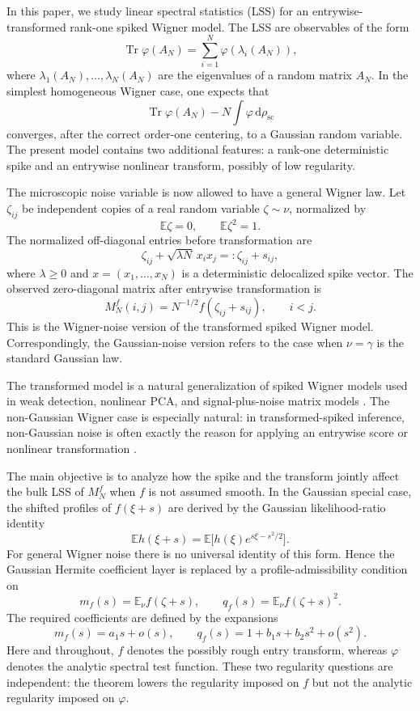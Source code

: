 \documentclass[11pt]{article}
\theoremstyle{definition}
\theoremstyle{remark}
\newcommand{\E}{\mathbb E}
\newcommand{\Tr}{\operatorname{Tr}}
\newcommand{\scal}{\mathrm{sc}}
\newcommand{\dd}{\mathrm d}
\begin{document}
In this paper, we study linear spectral statistics (LSS) for an entrywise-transformed rank-one spiked Wigner model.  The LSS are observables of the form
\[
        \Tr \varphi(A_N)=\sum_{i=1}^N \varphi(\lambda_i(A_N)),
\]
where \(\lambda_1(A_N),\ldots,\lambda_N(A_N)\) are the eigenvalues of a random matrix \(A_N\).  In the simplest homogeneous Wigner case, one expects that
\[
        \Tr\varphi(A_N)-N\int \varphi\,\dd\rho_{\scal}
\]
converges, after the correct order-one centering, to a Gaussian random variable.  The present model contains two additional features: a rank-one deterministic spike and an entrywise nonlinear transform, possibly of low regularity.

The microscopic noise variable is now allowed to have a general Wigner law.  Let \(\zeta_{ij}\) be independent copies of a real random variable \(\zeta\sim\nu\), normalized by
\[
        \E\zeta=0,\qquad \E\zeta^2=1.
\]
The normalized off-diagonal entries before transformation are
\[
        \zeta_{ij}+\sqrt{\lambda N}\,x_i x_j=:\zeta_{ij}+s_{ij},
\]
where \(\lambda\ge0\) and \(x=(x_1,\ldots,x_N)\) is a deterministic delocalized spike vector.  The observed zero-diagonal matrix after entrywise transformation is
\[
        M_N^f(i,j)=N^{-1/2}f(\zeta_{ij}+s_{ij}),\qquad i<j.
\]
This is the Wigner-noise version of the transformed spiked Wigner model. Correspondingly, the Gaussian-noise version refers to the case when \(\nu=\gamma\) is the standard Gaussian law.

The transformed model is a natural generalization of spiked Wigner models used in weak detection, nonlinear PCA, and signal-plus-noise matrix models \cite{Feldman2025,GuionnetKoKrzakalaMergnyZdeborova2023,MoniriHassani2024,LeeLee2025}.  The non-Gaussian Wigner case is especially natural: in transformed-spiked inference, non-Gaussian noise is often exactly the reason for applying an entrywise score or nonlinear transformation \cite{PerryWeinBandeiraMoitra2018,ChungLee2022}.

The main objective is to analyze how the spike and the transform jointly affect the bulk LSS of \(M_N^f\) when \(f\) is not assumed smooth.  In the Gaussian special case, the shifted profiles of \(f(\xi+s)\) are derived by the Gaussian likelihood-ratio identity
\[
        \E h(\xi+s)=\E\bigl[h(\xi)e^{s\xi-s^2/2}\bigr].
\]
For general Wigner noise there is no universal identity of this form.  Hence the Gaussian Hermite coefficient layer is replaced by a profile-admissibility condition on
\[
        m_f(s)=\E_\nu f(\zeta+s),\qquad
        q_f(s)=\E_\nu f(\zeta+s)^2.
\]
The required coefficients are defined by the expansions
\[
        m_f(s)=a_1s+o(s),\qquad
        q_f(s)=1+b_1s+b_2s^2+o(s^2).
\]
Here and throughout, $f$ denotes the possibly rough entry transform, whereas
$\varphi$ denotes the analytic spectral test function.  These two regularity
questions are independent: the theorem lowers the regularity imposed on $f$
but not the analytic regularity imposed on $\varphi$.
\end{document}
